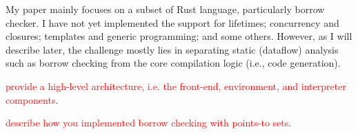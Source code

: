 My paper mainly focuses on a subset of Rust language, particularly borrow checker.
I have not yet implemented the support for lifetimes; concurrency and closures; templates
and generic programming; and some others. However, as I will describe later,
the challenge mostly lies in separating static (dataflow) analysis such as borrow
checking from the core compilation logic (i.e., code generation).

\textcolor{red}{provide a high-level architecture, i.e. the front-end, environment,
and interpreter components}.

\textcolor{red}{describe how you implemented borrow checking with points-to sets}.
